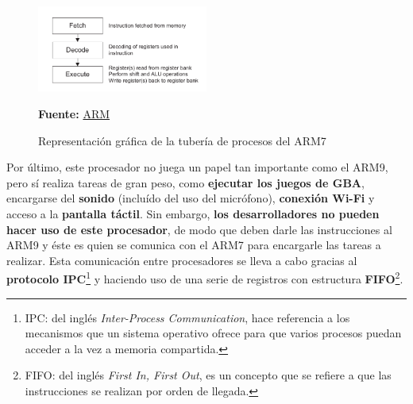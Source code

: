 \vspace{0.5cm}

 \begin{figure}[htbp]
\centering
  \includegraphics[width=0.5\textwidth]{archivos/arm7pipeline.png}
  \caption{Representación gráfica de la tubería de procesos del ARM7}
\textbf{Fuente:} \href{http://ww1.microchip.com/downloads/en/DeviceDoc/DDI0029G_7TDMI_R3_trm.pdf}{ARM}
  \label{fig:arm7pipeline}
\end{figure}

\vspace{0.5cm}

Por último, este procesador no juega un papel tan importante como el ARM9, pero sí realiza tareas de gran peso, como \textbf{ejecutar los juegos de GBA}, encargarse del \textbf{sonido} (incluído del uso del micrófono), \textbf{conexión Wi-Fi} y acceso a la \textbf{pantalla táctil}. Sin embargo, \textbf{los desarrolladores no pueden hacer uso de este procesador}, de modo que deben darle las instrucciones al ARM9 y éste es quien se comunica con el ARM7 para encargarle las tareas a realizar. Esta comunicación entre procesadores se lleva a cabo gracias al \textbf{protocolo IPC}\footnote{IPC: del inglés \textit{Inter-Process Communication}, hace referencia a los mecanismos que un sistema operativo ofrece para que varios procesos puedan acceder a la vez a memoria compartida.} y haciendo uso de una serie de registros con estructura \textbf{FIFO}\footnote{FIFO: del inglés \textit{First In, First Out}, es un concepto que se refiere a que las instrucciones se realizan por orden de llegada.}.

\vspace{1cm}

